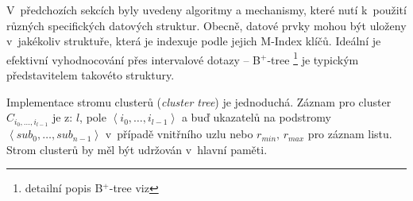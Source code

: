 V~předchozích sekcích byly uvedeny algoritmy a mechanismy, které
nutí k~použití různých specifických datových struktur\@. Obecně,
datové prvky mohou být uloženy v~jakékoliv struktuře, která je indexuje
podle jejich M-Index klíčů. Ideální je efektivní vyhodnocování přes
intervalové dotazy -- B$^{\text{+}}$-tree\cite{Cormen:2001:IA:580470}%
\footnote{detailní popis B$^{\text{+}}$-tree viz %
} je typickým představitelem takovéto struktury\@.

Implementace stromu clusterů (\emph{cluster tree}) je jednoduchá\@.
Záznam pro cluster $C_{i_{0},\ldots,i_{l-1}}$ je z: $l$, pole $\left\langle i_{0},\ldots,i_{l-1}\right\rangle $
a buď ukazatelů na podstromy $\left\langle sub_{0},\ldots,sub_{n-1}\right\rangle $
v~případě vnitřního uzlu nebo $r_{min},\, r_{max}$ pro záznam listu\@.
Strom clusterů by měl být udržován v~hlavní paměti\@.
